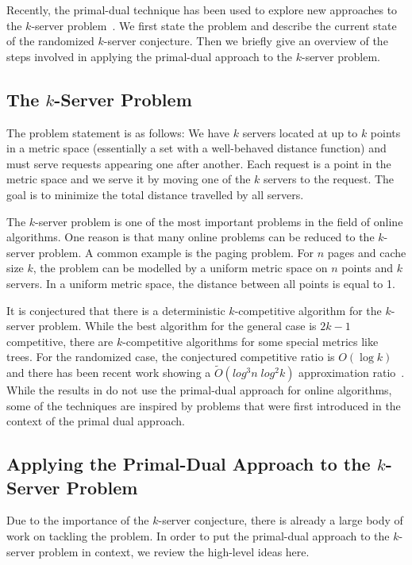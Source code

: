 Recently, the primal-dual technique has been used to explore new approaches to the $k$-server problem~\cite{bansal10:k-server}.
We first state the problem and describe the current state of the randomized $k$-server conjecture.
Then we briefly give an overview of the steps involved in applying the primal-dual approach to the $k$-server problem.

\subsection{The $k$-Server Problem}
The problem statement is as follows:
We have $k$ servers located at up to $k$ points in a metric space (essentially a set with a well-behaved distance function) and must serve requests appearing one after another.
Each request is a point in the metric space and we serve it by moving one of the $k$ servers to the request.
The goal is to minimize the total distance travelled by all servers.

The $k$-server problem is one of the most important problems in the field of online algorithms.
One reason is that many online problems can be reduced to the $k$-server problem.
A common example is the paging problem. For $n$ pages and cache size $k$, the problem can be modelled by a uniform metric space on $n$ points and $k$ servers.
In a uniform metric space, the distance between all points is equal to 1.

It is conjectured that there is a deterministic $k$-competitive algorithm for the $k$-server problem.
While the best algorithm for the general case is $2k -1$ competitive, there are $k$-competitive algorithms for some special metrics like trees.
For the randomized case, the conjectured competitive ratio is $O(\log k)$ and there has been recent work showing a $\tilde{O}(log^3 n \; log^2 k)$ approximation ratio~\cite{bansal11:randomized-k-server}.
While the results in \cite{bansal11:randomized-k-server} do not use the primal-dual approach for online algorithms, some of the techniques are inspired by problems that were first introduced in the context of the primal dual approach.

\subsection{Applying the Primal-Dual Approach to the $k$-Server Problem}
Due to the importance of the $k$-server conjecture, there is already a large body of work on tackling the problem.
In order to put the primal-dual approach to the $k$-server problem in context, we review the high-level ideas here.

